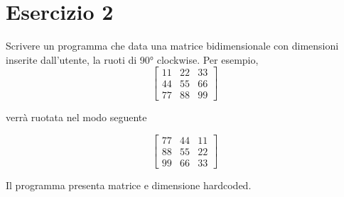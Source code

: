 \documentclass{article}
\begin{document}
    \newpage

\section*{Esercizio 2}

Scrivere un programma che data una matrice bidimensionale con dimensioni inserite dall'utente, la ruoti di 90° clockwise. Per esempio,
    \[
    \begin{bmatrix}
        11 & 22 & 33\\
        44 & 55 & 66\\
        77 & 88 & 99
    \end{bmatrix} \]
    
    \noindent verrà ruotata nel modo seguente
    
    \[
    \begin{bmatrix}
        77 & 44 & 11\\
        88 & 55 & 22\\
        99 & 66 & 33
    \end{bmatrix} \]

Il programma presenta matrice e dimensione hardcoded.
\end{document}
